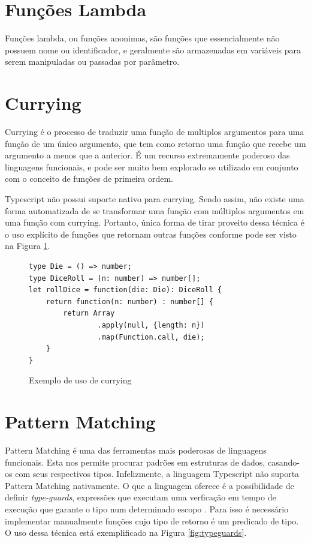 \documentclass[rel_mlp]{iiufrgs}
\numberwithin{figure}{chapter}
\begin{document}
\section{Funções Lambda}

Funções lambda, ou funções anonimas, são funções que essencialmente não possuem nome ou identificador, e geralmente são armazenadas em variáveis para serem manipuladas ou passadas por parâmetro.


\section{Currying}

Currying é o processo de traduzir uma função de multiplos argumentos para uma função de um único argumento, que tem como retorno uma função que recebe um argumento a menos que a anterior. É um recurso extremamente poderoso das linguagens funcionais, e pode ser muito bem explorado se utilizado em conjunto com o conceito de funções de primeira ordem.

Typescript não possui suporte nativo para currying. Sendo assim, não existe uma forma automatizada de se transformar uma função com múltiplos argumentos em uma função com currying. Portanto, única forma de tirar proveito dessa técnica é o uso explícito de funções que retornam outras funções conforme pode ser visto na Figura \ref{fig:currying}.

\begin{figure}[h]
\begin{verbatim}
type Die = () => number;
type DiceRoll = (n: number) => number[];
let rollDice = function(die: Die): DiceRoll {
    return function(n: number) : number[] {
        return Array
        		.apply(null, {length: n})
        		.map(Function.call, die);
    }
}
\end{verbatim}
\caption{Exemplo de uso de currying}
\label{fig:currying}
\end{figure}

\section{Pattern Matching}

Pattern Matching é uma das ferramentas mais poderosas de linguagens funcionais. Esta nos permite procurar padrões em estruturas de dados, casando-os com seus respectivos tipos. Infelizmente, a linguagem Typescript não suporta Pattern Matching nativamente. O que a linguagem oferece é a possibilidade de definir \textit{type-guards}, expressões que executam uma verficação em tempo de execução que garante o tipo num determinado escopo \cite{advancedtypes}. Para isso é necessário implementar manualmente funções cujo tipo de retorno é um predicado de tipo. O uso dessa técnica está exemplificado na Figura \ref{fig:typeguards}.
\end{document}
